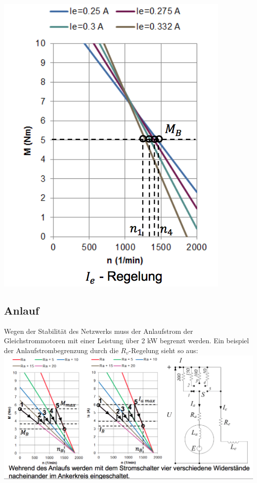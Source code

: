 \begin{minipage}{0.3 \linewidth}
\includegraphics[width = \linewidth]{./Pics/VL45/Drehzahlregelung3}
\end{minipage}

\subsection{Anlauf}
Wegen der Stabilität des Netzwerks muss der Anlaufstrom der Gleichstrommotoren mit einer Leistung über 2 kW begrenzt werden. Ein beispiel der Anlaufstrombegrenzung durch die $R_v$-Regelung sieht so aus: \\

\includegraphics[width = 0.8 \linewidth]{./Pics/VL45/Anlauf}

